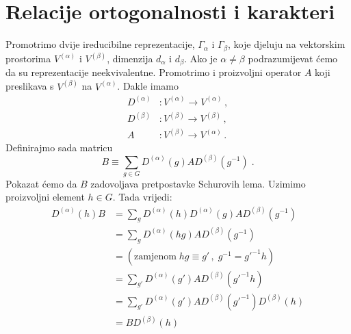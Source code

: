 \section{Relacije ortogonalnosti i karakteri}
\label{sec:ortogonalnost}

Promotrimo dvije ireducibilne reprezentacije, $\Gamma_{\alpha}$ i $\Gamma_{\beta}$,
koje djeluju na vektorskim prostorima $V^{(\alpha)}$ i $V^{(\beta)}$,
dimenzija $d_\alpha$ i $d_\beta$.
Ako je $\alpha\neq\beta$ podrazumijevat ćemo da su reprezentacije neekvivalentne.
Promotrimo i proizvoljni operator $A$ koji preslikava s $V^{(\beta)}$ na  $V^{(\alpha)}$.
Dakle imamo
\begin{align*}
D^{(\alpha)} &: V^{(\alpha)} \to V^{(\alpha)}\,, \\
D^{(\beta)}  &: V^{(\beta)}  \to V^{(\beta)} \,, \\
A          &: V^{(\beta)} \to V^{(\alpha)} \,.
\end{align*}
Definirajmo sada matricu
\begin{equation*}
B\equiv \sum_{g\in G} D^{(\alpha)}(g) A D^{(\beta)}(g^{-1}) \;.
\end{equation*}
Pokazat ćemo da $B$ zadovoljava pretpostavke Schurovih lema.
Uzimimo proizvoljni element $h\in G$. Tada vrijedi:
\begin{equation*}
\begin{split}
 D^{(\alpha)}(h)B &= \sum_g D^{(\alpha)}(h) D^{(\alpha)}(g) A
    D^{(\beta)}(g^{-1}) \\
&= \sum_g D^{(\alpha)}(hg) A D^{(\beta)}(g^{-1}) \\
&= ( \textrm{zamjenom}\; hg\equiv g' \, , \; g^{-1}=g'^{-1}h ) \\
&= \sum_{g'} D^{(\alpha)}(g') A D^{(\beta)}(g'^{-1}h) \\
&= \sum_{g'} D^{(\alpha)}(g') A D^{(\beta)}(g'^{-1}) D^{(\beta)}(h) \\
&= B D^{(\beta)}(h)
\end{split}
\end{equation*}

